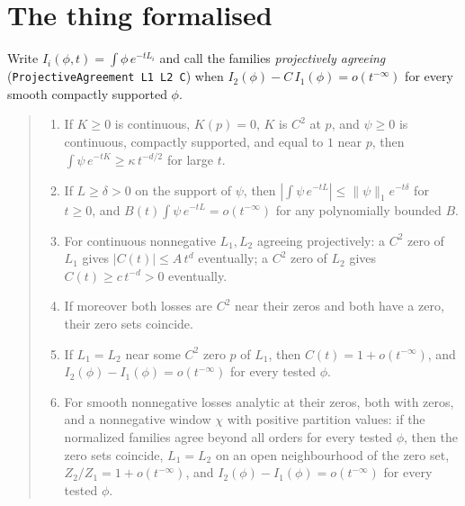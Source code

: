 \documentclass[11pt]{article}
\newcommand{\code}[1]{\texttt{#1}}
\begin{document}
\section{The thing formalised}

Write $I_i(\phi, t) = \int\phi\,e^{-tL_i}$ and call the families
\emph{projectively agreeing} (\code{ProjectiveAgreement L1 L2 C}) when
$I_2(\phi) - C\,I_1(\phi) = o(t^{-\infty})$ for every smooth compactly
supported $\phi$.

\begin{quote}\itshape
\begin{enumerate}
\item[(G)] If $K \ge 0$ is continuous, $K(p) = 0$, $K$ is $C^2$ at $p$,
and $\psi \ge 0$ is continuous, compactly supported, and equal to $1$
near $p$, then $\int\psi\,e^{-tK} \ge \kappa\,t^{-d/2}$ for large $t$.
\item[(E)] If $L \ge \delta > 0$ on the support of $\psi$, then
$|\int\psi\,e^{-tL}| \le \|\psi\|_1 e^{-t\delta}$ for $t \ge 0$, and
$B(t)\int\psi\,e^{-tL} = o(t^{-\infty})$ for any polynomially bounded
$B$.
\item[(T)] For continuous nonnegative $L_1, L_2$ agreeing projectively:
a $C^2$ zero of $L_1$ gives $|C(t)| \le A\,t^{d}$ eventually; a $C^2$
zero of $L_2$ gives $C(t) \ge c\,t^{-d} > 0$ eventually.
\item[(Z)] If moreover both losses are $C^2$ near their zeros and both
have a zero, their zero sets coincide.
\item[(R)] If $L_1 = L_2$ near some $C^2$ zero $p$ of $L_1$, then
$C(t) = 1 + o(t^{-\infty})$, and $I_2(\phi) - I_1(\phi) =
o(t^{-\infty})$ for every tested $\phi$.
\item[(N)] For smooth nonnegative losses analytic at their zeros, both
with zeros, and a nonnegative window $\chi$ with positive partition
values: if the normalized families agree beyond all orders for every
tested $\phi$, then the zero sets coincide, $L_1 = L_2$ on an open
neighbourhood of the zero set, $Z_2/Z_1 = 1 + o(t^{-\infty})$, and
$I_2(\phi) - I_1(\phi) = o(t^{-\infty})$ for every tested $\phi$.
\end{enumerate}
\end{quote}
\end{document}
